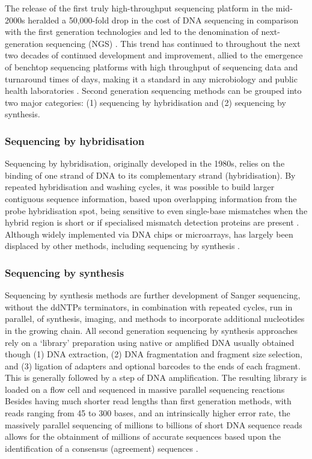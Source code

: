 The release of the first truly high-throughput sequencing platform in the mid-2000s heralded a 50,000-fold drop in the cost of DNA sequencing in comparison with the first generation technologies and led to the denomination of next-generation sequencing (NGS) \citep{goodwin_coming_2016}. This trend has continued to throughout the next two decades of continued development and improvement, allied to the emergence of benchtop sequencing platforms with high throughput of sequencing data and turnaround times of days, making it a standard in any microbiology and public health laboratories \citep{loman_twenty_2015}. Second generation sequencing methods can be grouped into two major categories: (1) sequencing by hybridisation and (2) sequencing by synthesis. 

\subsubsection{Sequencing by hybridisation}

Sequencing by hybridisation, originally developed in the 1980s, relies on the binding of one strand of DNA to its complementary strand (hybridisation). By repeated hybridisation and washing cycles, it was possible to build larger contiguous sequence information, based upon overlapping information from the probe hybridisation spot, being sensitive to even single-base mismatches when the hybrid region is short or if specialised mismatch detection proteins are present \citep{slatko_overview_2018, detter_nucleic_2014}. Although widely implemented via DNA chips or microarrays, has largely been displaced by other methods, including sequencing by synthesis \citep{goodwin_coming_2016}. 

\subsubsection{Sequencing by synthesis}

Sequencing by synthesis methods are further development of Sanger sequencing, without the ddNTPs terminators, in combination with repeated cycles, run in parallel, of synthesis, imaging, and methods to incorporate additional nucleotides in the growing chain. All second generation sequencing by synthesis approaches rely on a ‘library’ preparation using native or amplified DNA usually obtained though (1) DNA extraction, (2) DNA fragmentation and fragment size selection, and (3) ligation of adapters and optional barcodes to the ends of each fragment. This is generally followed by a step of DNA amplification. The resulting library is loaded on a flow cell and sequenced in massive parallel sequencing reactions \citep{giani_long_2020}
Besides having much shorter read lengths than first generation methods, with reads ranging from 45 to 300 bases, and an intrinsically higher error rate, the massively parallel sequencing of millions to billions of short DNA sequence reads allows for the obtainment of millions of accurate sequences based upon the identification of a consensus (agreement) sequences \citep{slatko_overview_2018, goodwin_coming_2016, hagemann_overview_2015}. 

